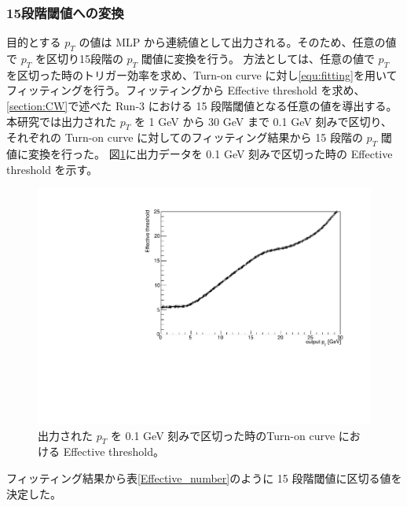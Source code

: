 \subsubsection{15段階閾値への変換}
目的とする $p_T$ の値は MLP から連続値として出力される。そのため、任意の値で $p_T$ を区切り15段階の $p_T$ 閾値に変換を行う。
方法としては、任意の値で $p_T$ を区切った時のトリガー効率を求め、Turn-on curve に対し\eqref{equ:fitting}を用いてフィッティングを行う。フィッティングから Effective threshold を求め、\ref{section:CW}で述べた Run-3 における 15 段階閾値となる任意の値を導出する。
本研究では出力された $p_T$ を 1 GeV から 30 GeV まで 0.1 GeV 刻みで区切り、それぞれの Turn-on curve に対してのフィッティング結果から 15 段階の $p_T$ 閾値に変換を行った。
図\ref{fig:Effictive_thr_v1}に出力データを 0.1 GeV 刻みで区切った時の Effective threshold を示す。
\begin{figure}[tb]
  \centering
  \includegraphics[clip, width=12cm]{fig/4/Effictive_thr_v1.pdf}
  \caption{出力された $p_T$ を 0.1 GeV 刻みで区切った時のTurn-on curve における Effective threshold。}
  \label{fig:Effictive_thr_v1}
\end{figure}
フィッティング結果から表\ref{Effective_number}のように 15 段階閾値に区切る値を決定した。
